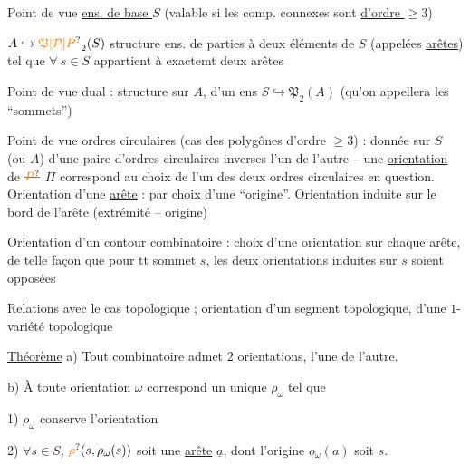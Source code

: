 Point de vue \uline{ens. de base $S$} (valable si les comp. connexes sont \uline{d'ordre $\geq3$})

$A\hookrightarrow\unsure{\mathfrak P|\mathcal P|P}_2(S)$ structure ens. de parties à deux éléments de $S$ (appelées \uline{arêtes}) tel que $\forall\ s\in S$ appartient à exactemt deux arêtes

Point de vue dual : structure sur $A$, d'un ens $S\hookrightarrow\mathfrak P_2(A)$ (qu'on appellera les ``sommets'')

Point de vue ordres circulaires (cas des polygônes d'ordre $\geq3$) : donnée sur $S$ (ou $A$) d'une paire d'ordres circulaires  inverses l'un de l'autre -- une \uline{orientation} de $\deleted{\unsure{P}}$ $\Pi$ correspond au choix de l'un des deux ordres circulaires en question.
Orientation d'une \uline{arête} : par choix d'une ``origine''.
Orientation induite sur le bord de l'arête (extrémité -- origine)

Orientation d'un contour combinatoire : choix d'une orientation sur chaque arête, de telle façon que pour tt sommet $s$, les deux orientations induites sur $s$ soient opposées
\diagram{\begin{tikzcd}[ampersand replacement=\&,row sep=.2em,column sep=2em]
{} \arrow[dr] \& \& {}\\
\& \bullet \arrow[ur] \&
\end{tikzcd}}

 Relations avec le cas topologique ; orientation d'un segment topologique, d'une $1$-variété topologique

\uline{Théorème} a) Tout \uline{} combinatoire admet  $2$ orientations,   l'une de l'autre.

b) À toute orientation $\omega$  correspond un unique  $\rho_\omega$ tel que

1) $\rho_\omega$ conserve l'orientation

2) $\forall s\in S$, $\deleted{\unsure{\rho}}(s,\rho_\omega(s))$ soit une \uline{arête} $\underline a$, dont l'origine $o_\omega(a)$ soit $s$.

